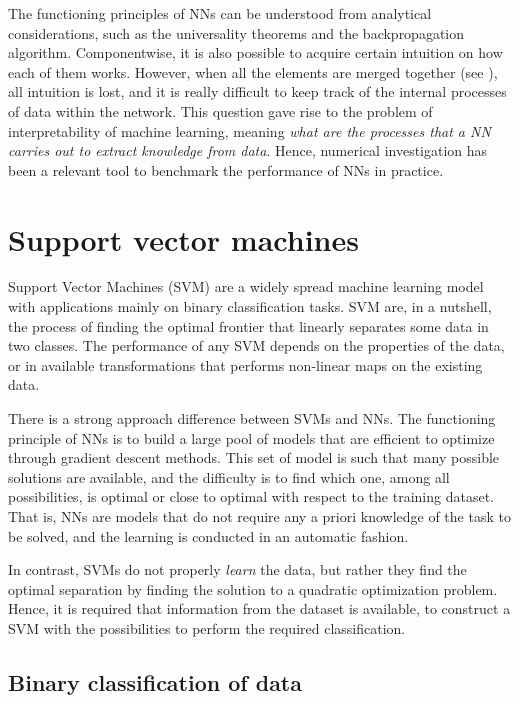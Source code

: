 \documentclass[]{report}
\begin{document}
The functioning principles of NNs can be understood from analytical considerations, such as the universality theorems and the backpropagation algorithm. Componentwise, it is also possible to acquire certain intuition on how each of them works. However, when all the elements are merged together (see ), all intuition is lost, and it is really difficult to keep track of the internal processes of data within the network. This question gave rise to the problem of interpretability of machine learning, meaning \textit{what are the processes that a NN carries out to extract knowledge from data}. 
Hence, numerical investigation has been a relevant tool to benchmark the performance of NNs in practice. 

\section{Support vector machines}

Support Vector Machines (SVM) are a widely spread machine learning model with applications mainly on binary classification tasks. SVM are, in a nutshell, the process of finding the optimal frontier that linearly separates some data in two classes. The performance of any SVM depends on the properties of the data, or in available transformations that performs non-linear maps on the existing data. 

There is a strong approach difference between SVMs and NNs. The functioning principle of NNs is to build a large pool of models that are efficient to optimize through gradient descent methods. This set of model is such that many possible solutions are available, and the difficulty is to find which one, among all possibilities, is optimal or close to optimal with respect to the training dataset. That is, NNs are models that do not require any a priori knowledge of the task to be solved, and the learning is conducted in an automatic fashion. 

In contrast, SVMs do not properly \textit{learn} the data, but rather they find the optimal separation by finding the solution to a quadratic optimization problem. Hence, it is required that information from the dataset is available, to construct a SVM with the possibilities to perform the required classification. 

\subsection{Binary classification of data}
\end{document}
